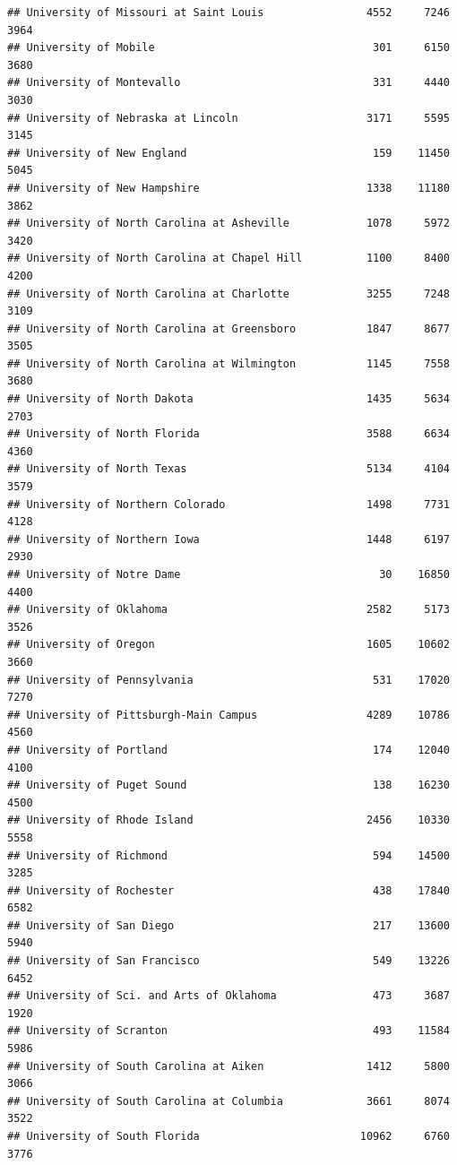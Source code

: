 \documentclass[
]{article}
\begin{document}
\begin{verbatim}
## University of Missouri at Saint Louis                4552     7246       3964
## University of Mobile                                  301     6150       3680
## University of Montevallo                              331     4440       3030
## University of Nebraska at Lincoln                    3171     5595       3145
## University of New England                             159    11450       5045
## University of New Hampshire                          1338    11180       3862
## University of North Carolina at Asheville            1078     5972       3420
## University of North Carolina at Chapel Hill          1100     8400       4200
## University of North Carolina at Charlotte            3255     7248       3109
## University of North Carolina at Greensboro           1847     8677       3505
## University of North Carolina at Wilmington           1145     7558       3680
## University of North Dakota                           1435     5634       2703
## University of North Florida                          3588     6634       4360
## University of North Texas                            5134     4104       3579
## University of Northern Colorado                      1498     7731       4128
## University of Northern Iowa                          1448     6197       2930
## University of Notre Dame                               30    16850       4400
## University of Oklahoma                               2582     5173       3526
## University of Oregon                                 1605    10602       3660
## University of Pennsylvania                            531    17020       7270
## University of Pittsburgh-Main Campus                 4289    10786       4560
## University of Portland                                174    12040       4100
## University of Puget Sound                             138    16230       4500
## University of Rhode Island                           2456    10330       5558
## University of Richmond                                594    14500       3285
## University of Rochester                               438    17840       6582
## University of San Diego                               217    13600       5940
## University of San Francisco                           549    13226       6452
## University of Sci. and Arts of Oklahoma               473     3687       1920
## University of Scranton                                493    11584       5986
## University of South Carolina at Aiken                1412     5800       3066
## University of South Carolina at Columbia             3661     8074       3522
## University of South Florida                         10962     6760       3776

\end{verbatim}
\end{document}
